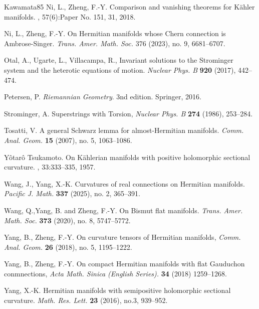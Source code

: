 \documentclass[12pt, reqno]{amsart}
\theoremstyle{plain}
\theoremstyle{definition}
\renewcommand{\>}{\rightarrow}
\renewcommand{\>}{\rightarrow}
\numberwithin{equation}{section} %
\begin{document}
\begin{thebibliography}{Kawamata85}
 Ni, L.,   Zheng, F.-Y.
    \newblock Comparison and vanishing theorems for {K}\"ahler manifolds.
    , 57(6):Paper No. 151, 31, 2018.


     Ni, L.,   Zheng, F.-Y.
    On Hermitian manifolds whose Chern connection is Ambrose-Singer.
    \emph{Trans. Amer. Math. Soc.} 376 (2023), no. 9, 6681--6707.



     Otal, A., Ugarte, L., Villacampa, R., Invariant
    solutions to the Strominger system and the heterotic equations of
    motion. \emph{Nuclear Phys. B} \textbf{920} (2017), 442--474.

 Petersen, P. \emph{Riemannian Geometry}. 3nd edition. Springer, 2016.





     Strominger, A. Superstrings with Torsion,
    \emph{Nuclear Phys. B} \textbf{274} (1986), 253--284.


Tosatti, V.
A general Schwarz lemma for almost-Hermitian manifolds.
\emph{Comm. Anal. Geom.} \textbf{15} (2007), no. 5, 1063--1086.

   Y\^otar\^o Tsukamoto.
   \newblock On {K}\"ahlerian manifolds with positive holomorphic sectional curvature.
   , 33:333--335, 1957.

      Wang, J.,  Yang, X.-K.  Curvatures of real
    connections on Hermitian manifolds.
    \emph{Pacific J. Math.} \textbf{337} (2025), no. 2, 365--391.

     Wang, Q.,Yang, B. and Zheng, F.-Y. On Bismut flat manifolds. \emph{Trans. Amer. Math. Soc.} \textbf{373} (2020), no. 8, 5747--5772.


     Yang, B., Zheng, F.-Y. On curvature tensors of Hermitian manifolds,
    \emph{Comm. Anal. Geom.} \textbf{26} (2018), no. 5, 1195--1222.


     Yang, B., Zheng, F.-Y. On compact Hermitian manifolds with flat Gauduchon conmnections,
    \emph{Acta Math. Sinica (English Series).} \textbf{34} (2018)
    1259--1268.


     Yang, X.-K. Hermitian manifolds with semipositive holomorphic sectional curvature.
    \emph{Math. Res. Lett.} \textbf{23} (2016), no.3, 939--952.





\end{thebibliography}
\end{document}

